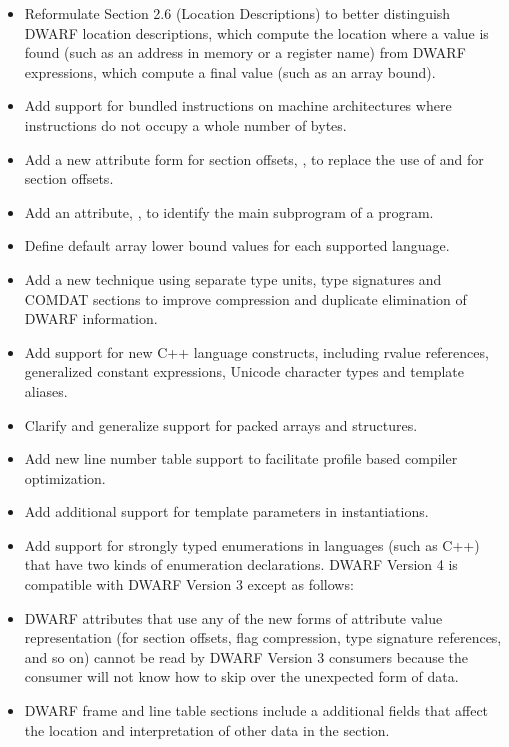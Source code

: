 \begin{itemize}

\item Reformulate 
Section 2.6 (Location Descriptions) 
to better distinguish DWARF location descriptions, which
compute the location where a value is found (such as an address in memory or a register
name) from DWARF expressions, which compute a final value (such as an array bound).
\item Add support for bundled instructions on machine architectures where instructions do not
occupy a whole number of bytes.
\item Add a new attribute form for section offsets, , to replace the use
of  and  for section offsets.
\item Add an attribute, , to identify the main subprogram of a
program.
\item Define default array lower bound values for each supported language.
\item Add a new technique using separate type units, type signatures and COMDAT sections to
improve compression and duplicate elimination of DWARF information.
\item Add support for new C++ language constructs, including rvalue references, generalized
constant expressions, Unicode character types and template aliases.
\item Clarify and generalize support for packed arrays and structures.
\item Add new line number table support to facilitate profile based compiler optimization.
\item Add additional support for template parameters in instantiations.
\item Add support for strongly typed enumerations in languages (such as C++) that have two
kinds of enumeration declarations.
DWARF Version 4 is compatible with DWARF Version 3 except as follows:
\item DWARF attributes that use any of the new forms of attribute value representation (for
section offsets, flag compression, type signature references, and so on) cannot be read by
DWARF Version 3 consumers because the consumer will not know how to skip over the
unexpected form of data.
\item DWARF frame and line table sections include a additional fields that affect the location
and interpretation of other data in the section.
\end{itemize}


